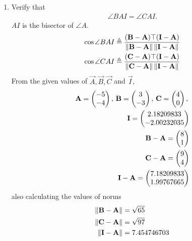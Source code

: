 \documentclass[10pt]{book}
\begin{document}
\begin{enumerate}[label=\thesection.\arabic*.,ref=\thesection.\theenumi]
  
\item Verify that 
\begin{align}
\angle BAI = \angle CAI.
\end{align}
$AI$ is the bisector of $\angle A$. \\
\solution
\begin{align}
\label{eq:1.5.5.2}
\cos{\angle BAI} \triangleq \frac{(\vec{B}-\vec{A})\top(\vec{I}-\vec{A})}{\norm{\vec{B}-\vec{A}}\norm{\vec{I}-\vec{A}}} \\
\cos{\angle CAI} \triangleq \frac{(\vec{C}-\vec{A})\top(\vec{I}-\vec{A})}{\norm{\vec{C}-\vec{A}}\norm{\vec{I}-\vec{A}}} 
\end{align}
From the given values of $\vec{A},\vec{B},\vec{C}$ and $\vec{I}$,\\
\begin{align}
    \mathbf{A}=\begin{pmatrix}-5 \\ -4\end{pmatrix},\,
    \mathbf{B}=\begin{pmatrix}3\\-3\end{pmatrix},\,
    \mathbf{C}=\begin{pmatrix}4\\0\end{pmatrix},\, \\
    \mathbf{I}=\begin{pmatrix}2.18209833 \\ -2.00232035\end{pmatrix}\\
    \mathbf{B}-\mathbf{A} =\begin{pmatrix}8\\1\end{pmatrix} \\
    \mathbf{C}-\mathbf{A}= \begin{pmatrix}9\\4\end{pmatrix} \\
 \mathbf{I}-\mathbf{A}=\begin{pmatrix}7.18209833 \\ 1.99767665\end{pmatrix}
\end{align}
also calculating the values of norms
\begin{align}
	\left\lVert\mathbf{B}-\mathbf{A}\right\rVert &= \sqrt{65}\\
	\left\lVert\mathbf{C}-\mathbf{A}\right\rVert &= \sqrt{97} \\
 	\left\lVert\mathbf{I}-\mathbf{A}\right\rVert &= 7.454746703 \\
\end{align}


\end{enumerate}
\end{document}
